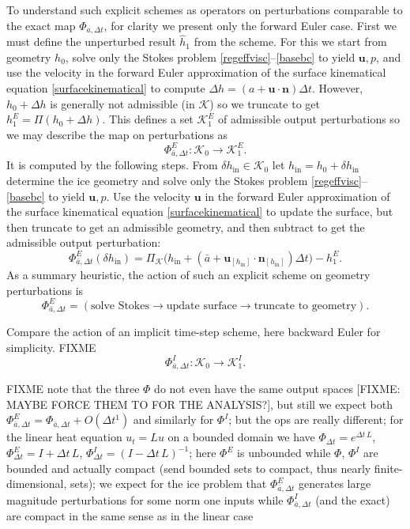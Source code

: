 \documentclass[letterpaper,final,12pt,reqno]{amsart}
\newcommand{\bn}{\mathbf{n}}
\newcommand{\bu}{\mathbf{u}}
\newcommand{\PiK}{\Pi_{\mathcal{K}}}
\newcommand{\hin}{h_{\text{in}}}
\newcommand{\dhin}{\delta h_{\text{in}}}
\begin{document}
To understand such explicit schemes as operators on perturbations comparable to the exact map $\Phi_{a,\Delta t}$, for clarity we present only the forward Euler case.  First we must define the unperturbed result $\hat h_1$ from the scheme.  For this we start from geometry $h_0$, solve only the Stokes problem \eqref{regeffvisc}--\eqref{basebc} to yield $\bu,p$, and use the velocity in the forward Euler approximation of the surface kinematical equation \eqref{surfacekinematical} to compute $\Delta h = \left(a + \bu\cdot \bn\right) \Delta t$.  However, $h_0+\Delta h$ is generally not admissible (in $\mathcal{K}$) so we truncate to get $h^E_1 = \Pi(h_0+\Delta h)$.  This defines a set $\mathcal{K}^E_1$ of admissible output perturbations so we may describe the map on perturbations as
\begin{equation}
\Phi^E_{\bar a,\Delta t} : \mathcal{K}_0 \to \mathcal{K}^E_1. \label{perturboperatorexplicit}
\end{equation}
It is computed by the following steps.  From $\dhin\in \mathcal{K}_0$ let $\hin=h_0+\dhin$ determine the ice geometry and solve only the Stokes problem \eqref{regeffvisc}--\eqref{basebc} to yield $\bu,p$.  Use the velocity $\bu$ in the forward Euler approximation of the surface kinematical equation \eqref{surfacekinematical} to update the surface, but then truncate to get an admissible geometry, and then subtract to get the admissible output perturbation:
    $$\Phi^E_{\bar a,\Delta t}(\dhin) = \PiK\Big(\hin + \left(\bar a + \bu_{[\hin]} \cdot \bn_{[\hin]}\right) \Delta t\Big) - h^E_1.$$
As a summary heuristic, the action of such an explicit scheme on geometry perturbations is
    $$\Phi^E_{\bar a,\Delta t} = (\text{solve Stokes} \to \text{update surface} \to \text{truncate to geometry}).$$

Compare the action of an implicit time-step scheme, here backward Euler for simplicity.  FIXME
\begin{equation}
\Phi^I_{\bar a,\Delta t} : \mathcal{K}_0 \to \mathcal{K}^I_1. \label{perturboperatorimplicit}
\end{equation}

FIXME note that the three $\Phi$ do not even have the same output spaces [FIXME: MAYBE FORCE THEM TO FOR THE ANALYSIS?], but still we expect both $\Phi^E_{\bar a,\Delta t} = \Phi_{\bar a,\Delta t} + O(\Delta t^1)$ and similarly for $\Phi^I$; but the ops are really different; for the linear heat equation $u_t=Lu$ on a bounded domain we have $\Phi_{\Delta t} = e^{\Delta t\,L}$, $\Phi^E_{\Delta t} = I + \Delta t\,L$, $\Phi^I_{\Delta t} = (I - \Delta t\,L)^{-1}$; here $\Phi^E$ is unbounded while $\Phi$, $\Phi^I$ are bounded and actually compact (send bounded sets to compact, thus nearly finite-dimensional, sets); we expect for the ice problem that $\Phi^E_{\bar a,\Delta t}$ generates large magnitude perturbations for some norm one inputs while $\Phi^I_{\bar a,\Delta t}$ (and the exact) are compact in the same sense as in the linear case
\end{document}
